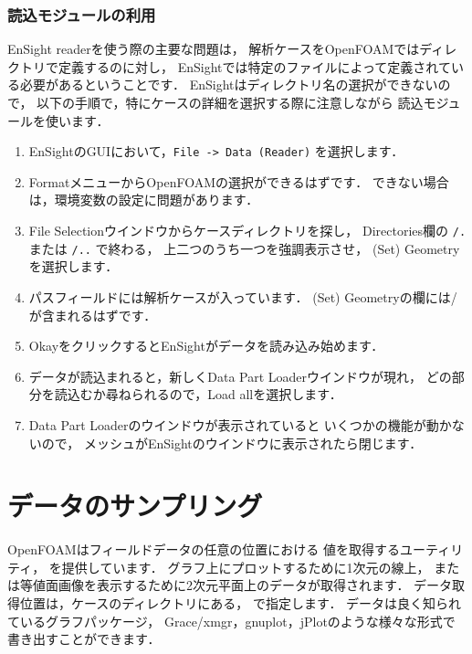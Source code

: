 \subsubsection{読込モジュールの利用}
\label{sssec:6.4.2.2}
EnSight readerを使う際の主要な問題は，
解析ケースをOpenFOAMではディレクトリで定義するのに対し，
EnSightでは特定のファイルによって定義されている必要があるということです．
EnSightはディレクトリ名の選択ができないので，
以下の手順で，特にケースの詳細を選択する際に注意しながら
読込モジュールを使います．
\begin{enumerate}
 \item EnSightのGUIにおいて，\texttt{File -> Data (Reader)} を選択します．
 \item FormatメニューからOpenFOAMの選択ができるはずです．
       できない場合は，環境変数の設定に問題があります．
 \item File Selectionウインドウからケースディレクトリを探し，
       Directories欄の \verb|/.| または \verb|/..| で終わる，
       上二つのうち一つを強調表示させ，
       (Set) Geometryを選択します．
 \item パスフィールドには解析ケースが入っています．
       (Set) Geometryの欄には/が含まれるはずです．
 \item OkayをクリックするとEnSightがデータを読み込み始めます．
 \item データが読込まれると，新しくData Part Loaderウインドウが現れ，
       どの部分を読込むか尋ねられるので，Load allを選択します．
 \item Data Part Loaderのウインドウが表示されていると
       いくつかの機能が動かないので，
       メッシュがEnSightのウインドウに表示されたら閉じます．
\end{enumerate}



\section{データのサンプリング}
\label{sec:6.5}
OpenFOAMはフィールドデータの任意の位置における
値を取得するユーティリティ，
%
%
を提供しています．
グラフ上にプロットするために1次元の線上，
または等値面画像を表示するために2次元平面上のデータが取得されます．
データ取得位置は，ケースのディレクトリにある，
で指定します．
データは良く知られているグラフパッケージ，
Grace/xmgr，gnuplot，jPlotのような様々な形式で書き出すことができます．

